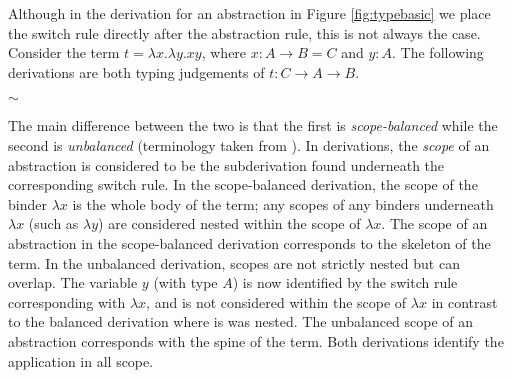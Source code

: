 \documentclass[a4paper,UKenglish,cleveref, autoref]{lipics-v2019}
\makeatletter
\newcommand{\apprule}{@}
\newcommand{\lamrule}{\lambda}
\makeatother
\begin{document}
Although in the derivation for an abstraction in Figure \ref{fig:typebasic} we place the switch rule directly after the abstraction rule, this is not always the case. Consider the term $t = \lambda x . \lambda y . x y$, where $x : A \rightarrow B =  C$ and $y : A$. The following derivations are both typing judgements of $t : C \rightarrow A \rightarrow B$.
\begin{center}
\drv{\top ; -[\lamrule] ; C \rightarrow \drv[green]{C \wedge \drv[yellow]{\top ;-[\lamrule] ; A \rightarrow A} ; -[s] ; A \rightarrow \drv[magenta]{C \wedge A ; -[\apprule] ; B}}}
\hspace{0.5cm}
$\sim$
\hspace{0.5cm}
\drv{ \drv{\top ; -[\lamrule] ; C \rightarrow C} \wedge \drv[yellow]{\top ; -[\lamrule] ; A \rightarrow A} ; -[s] ; C \rightarrow \drv[green]{C \wedge (A \rightarrow A) ; -[s] ; A \rightarrow \drv[magenta]{C \wedge A ; -[\apprule] ; B}}}
\end{center}

The main difference between the two is that the first is \emph{scope-balanced} while the second is \emph{unbalanced} (terminology taken from \cite{hendriks2003lambda}). In derivations, the \emph{scope} of an abstraction is considered to be the subderivation found underneath the corresponding switch rule. In the scope-balanced derivation, the scope of the binder $\lambda x$ is the whole body of the term; any scopes of any binders underneath $\lambda x$ (such as $\lambda y$) are considered nested within the scope of $\lambda x$. The scope of an abstraction in the scope-balanced derivation corresponds to the skeleton of the term. In the unbalanced derivation, scopes are not strictly nested but can overlap. The variable $y$ (with type $A$) is now identified by the switch rule corresponding with $\lambda x$, and is not considered within the scope of $\lambda x$ in contrast to the balanced derivation where is was nested. The unbalanced scope of an abstraction corresponds with the spine of the term. Both derivations identify the application in all scope.

\end{document}
